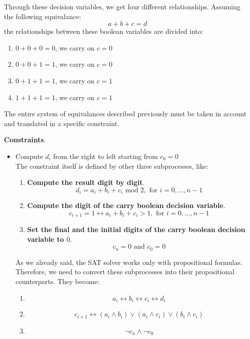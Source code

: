 \begin{example}
    Through these decision variables, we get four different relationships. Assuming the following equivalance:
    $$ a + b + c = d $$
    the relationships between these boolean variables are divided into:
    \begin{enumerate}
        \item $0 + 0 + 0 = 0$, we carry on $c = 0$
        \item $0 + 0 + 1 = 1$, we carry on $c = 0$
        \item $0 + 1 + 1 = 1$, we carry on $c = 1$
        \item $1 + 1 + 1 = 1$, we carry on $c = 1$
    \end{enumerate}
    The entire system of equivalances described previously must be taken in account and translated in a specific constraint. \vspace{7pt}

    \textbf{Constraints}.
    \begin{itemize}
        \renewcommand{\labelitemi}{-}
        \item Compute $d_i$ from the right to left starting from $c_0 = 0$ \vspace{3.5pt} \\
        The constraint itself is defined by other three subprocesses, like:
        \begin{enumerate}
            \item \textbf{Compute the result digit by digit}. $$ d_i = a_i + b_i + c_i \text{ mod } 2, \text{ for } i = 0, \dots, n - 1 $$
            \item \textbf{Compute the digit of the carry boolean decision variable}. $$ c_{i + 1} = 1 \leftrightarrow a_i + b_i + c_i > 1, \text{ for } i = 0, \dots, n-1 $$
            \item \textbf{Set the final and the initial digits of the carry boolean decision variable to $0$}. $$ c_n = 0 \text{ and } c_0 = 0 $$
        \end{enumerate} \vspace{7pt}

        As we already said, the SAT solver works only with propositional formulas. Therefore, we need to convert these subprocesses into their propositional
        counterparts. They become:
        \begin{enumerate}
            \item $$ a_i \leftrightarrow b_i \leftrightarrow c_i \leftrightarrow d_i $$
            \item $$ c_{i+1} \leftrightarrow (a_i \wedge b_i) \vee (a_i \wedge c_i) \vee (b_i \wedge c_i) $$
            \item $$ \neg c_n \wedge \neg c_0 $$
        \end{enumerate}
    \end{itemize}


\end{example}
